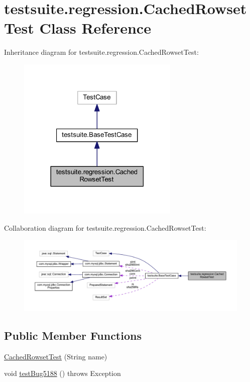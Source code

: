 \hypertarget{classtestsuite_1_1regression_1_1_cached_rowset_test}{}\section{testsuite.\+regression.\+Cached\+Rowset\+Test Class Reference}
\label{classtestsuite_1_1regression_1_1_cached_rowset_test}


Inheritance diagram for testsuite.\+regression.\+Cached\+Rowset\+Test\+:
\nopagebreak
\begin{figure}[H]
\begin{center}
\leavevmode
\includegraphics[width=218pt]{classtestsuite_1_1regression_1_1_cached_rowset_test__inherit__graph}
\end{center}
\end{figure}


Collaboration diagram for testsuite.\+regression.\+Cached\+Rowset\+Test\+:
\nopagebreak
\begin{figure}[H]
\begin{center}
\leavevmode
\includegraphics[width=350pt]{classtestsuite_1_1regression_1_1_cached_rowset_test__coll__graph}
\end{center}
\end{figure}
\subsection*{Public Member Functions}
\begin{DoxyCompactItemize}
\item 
\mbox{\hyperlink{classtestsuite_1_1regression_1_1_cached_rowset_test_a928cdd9b59eb0bbfcc9e8332f935624e}{Cached\+Rowset\+Test}} (String name)
\item 
void \mbox{\hyperlink{classtestsuite_1_1regression_1_1_cached_rowset_test_a463f914f431e564bd1e4fe42de779037}{test\+Bug5188}} ()  throws Exception 
\end{DoxyCompactItemize}
